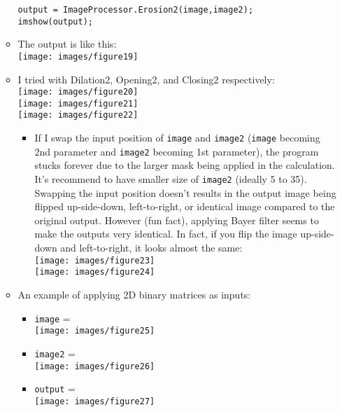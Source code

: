 \documentclass[11pt]{amsart}
\theoremstyle{remark}
\providecommand{\tightlist}{%
  \setlength{\itemsep}{0pt}\setlength{\parskip}{0pt}}
\theoremstyle{definition}
\theoremstyle{remark}
\numberwithin{equation}{section}
\begin{document}
\begin{itemize}
\begin{itemize}
\begin{verbatim}
output = ImageProcessor.Erosion2(image,image2);
imshow(output);
\end{verbatim}
  \item
    The output is like this:\\
    \texttt{[image: images/figure19]}\\
  \item
    I tried with Dilation2, Opening2, and Closing2 respectively:\\
    \texttt{[image: images/figure20]}\\
    \texttt{[image: images/figure21]}\\
    \texttt{[image: images/figure22]}

    \begin{itemize}
    \tightlist
    \item
      If I swap the input position of \texttt{image} and \texttt{image2}
      (\texttt{image} becoming 2nd parameter and \texttt{image2}
      becoming 1st parameter), the program stucks forever due to the
      larger mask being applied in the calculation. It's recommend to
      have smaller size of \texttt{image2} (ideally 5 to 35). Swapping
      the input position doesn't results in the output image being
      flipped up-side-down, left-to-right, or identical image compared
      to the original output. However (fun fact), applying Bayer filter
      seems to make the outputs very identical. In fact, if you flip the
      image up-side-down and left-to-right, it looks almost the same:\\
      \texttt{[image: images/figure23]}\\
      \texttt{[image: images/figure24]}\\
    \end{itemize}
  \item
    An example of applying 2D binary matrices as inputs:

    \begin{itemize}
    \tightlist
    \item
      \texttt{image} =\\
      \texttt{[image: images/figure25]}\\
    \item
      \texttt{image2} =\\
      \texttt{[image: images/figure26]}\\
    \item
      \texttt{output} =\\
      \texttt{[image: images/figure27]}
    \end{itemize}
  \end{itemize}
\end{itemize}
\end{document}
